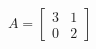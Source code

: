 \documentclass[preview]{standalone}
\begin{document}
\begin{align*}
A = \begin{bmatrix} 3 & 1 \\ 0 & 2 \end{bmatrix}
\end{align*}
\end{document}
